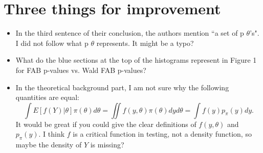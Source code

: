 \documentclass[11pt]{article}
\begin{document}
\section{Three things for improvement}
\begin{itemize}
    \item In the third sentence of their conclusion, the authors mention ``a set of p $\theta$’s". I did not follow what p $\theta$ represents. It might be a typo?
    
    \item What do the blue sections at the top of the histograms represent in Figure 1 for FAB p-values vs. Wald FAB p-values?

    
    \item In the theoretical background part, I am not sure why the following quantities are equal:
    $$
    \int E[f(Y)|\theta] \pi(\theta) d\theta = \iint f(y,\theta)\pi(\theta)dyd\theta= \int f(y) p_\pi(y) dy .
    $$
    It would be great if you could give the clear definitions of $f(y,\theta)$ and $p_\pi(y)$. I think $f$ is a critical function in testing, not a density function, so maybe the density of $Y$ is missing?
\end{itemize}
\end{document}

